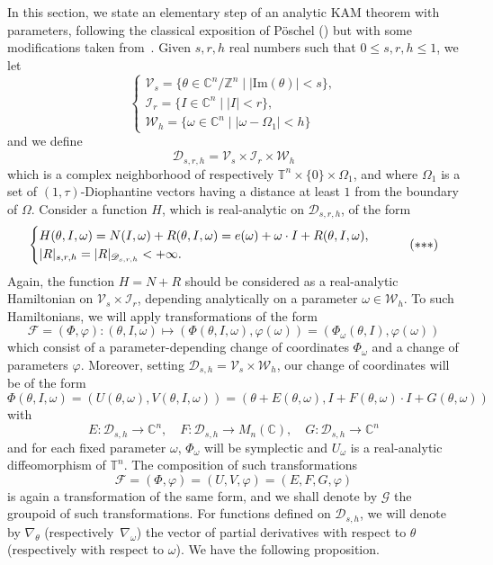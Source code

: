 \documentclass[11pt]{article}
\providecommand{\C}{}
\providecommand{\C}{}
\let\mathcal\mathscr
\let\sep\mid
\numberwithin{equation}{section}
\theoremstyle{plain}
\theoremstyle{definition}
\newcommand{\Z}{\mathbb{Z}}
\renewcommand{\C}{\mathbb{C}}
\newcommand\T{\mathbb T}
\begin{document}
In this section, we state an elementary step of an analytic KAM theorem with parameters, following the classical exposition of Pöschel (\cite{Pos01}) but with some modifications taken from~\cite{Rus01}. Given $s,r,h$ real numbers such that $0 \leq s,r,h \leq 1$, we let
\[
\begin{cases}
\mathcal{V}_s= \{ \theta \in \C^n / \Z^n \sep |\mathrm{Im}(\theta)|<s \}, \\
\mathcal{I}_{r}=\{ I \in \C^n \sep |I|<r \}, \\
\mathcal{W}_h=\{ \omega \in \C^n \sep |\omega-\Omega_1|<h \}
\end{cases}
\]
and we define
\[ \mathcal{D}_{s,r,h}=\mathcal{V}_s\times \mathcal{I}_r \times \mathcal{W}_h \]
which is a complex neighborhood of respectively $\T^n \times \{0\} \times \Omega_1$, and where $\Omega_1$ is a set of $(1,\tau)$-Diophantine vectors having a distance at least $1$ from the boundary of $\Omega$. Consider a function $H$, which is real-analytic on $\mathcal{D}_{s,r,h}$, of the form
\begin{equation}\label{Ham3}
\begin{cases}
H(\theta,I,\omega)=N(I,\omega)+R(\theta,I,\omega)=e(\omega)+\omega \cdot I+R(\theta,I,\omega), \\
|R|_{s,r,h}=|R|_{\mathcal{D}_{s,r,h}} <+\infty.
\end{cases}
\tag{${*}{*}{*}$}
\end{equation}
Again, the function $H=N+R$ should be considered as a real-analytic Hamiltonian on $\mathcal{V}_s \times \mathcal{I}_r$, depending analytically on a parameter $\omega \in \mathcal{W}_h$. To such Hamiltonians, we will apply transformations of the form
\[ \mathcal{F}=(\Phi,\varphi): (\theta,I,\omega) \mapsto (\Phi(\theta,I,\omega),\varphi(\omega))=(\Phi_\omega(\theta,I),\varphi(\omega)) \]
which consist of a parameter-depending change of coordinates $\Phi_\omega$ and a change of parameters $\varphi$. Moreover, setting $\mathcal{D}_{s,h}=\mathcal{V}_s \times \mathcal{W}_h$, our change of coordinates will be of
the form
\[\Phi(\theta,I,\omega)=(U(\theta,\omega),V(\theta,I,\omega))=(\theta+E(\theta,\omega),I+F(\theta,\omega)\cdot
I+G(\theta,\omega)) \] with
\[ E : \mathcal{D}_{s,h} \to \C^n, \quad F : \mathcal{D}_{s,h}
\to M_n(\C), \quad G : \mathcal{D}_{s,h} \to \C^n \]
and for each fixed parameter $\omega$, $\Phi_\omega$ will be
symplectic and $U_\omega$ is a real-analytic diffeomorphism of $\T^n$. The composition of such transformations
\[ \mathcal{F}=(\Phi,\varphi)=(U,V,\varphi)=(E,F,G,\varphi) \]
is again a transformation of the same form, and we shall denote by $\mathcal{G}$ the groupoid of such transformations. For functions defined on $\mathcal{D}_{s,h}$, we will denote by $\nabla_\theta$ (respectively~$\nabla_\omega$) the vector of partial derivatives with respect to $\theta$ (respectively with respect to $\omega$). We have the following proposition.
\end{document}
